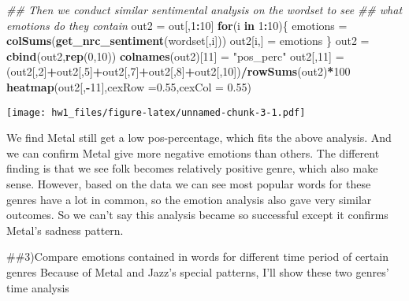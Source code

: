 \documentclass[]{article}
\newenvironment{Shaded}{\begin{snugshade}}{\end{snugshade}}
\newcommand{\CommentTok}[1]{\textcolor[rgb]{0.56,0.35,0.01}{\textit{#1}}}
\newcommand{\ControlFlowTok}[1]{\textcolor[rgb]{0.13,0.29,0.53}{\textbf{#1}}}
\newcommand{\DataTypeTok}[1]{\textcolor[rgb]{0.13,0.29,0.53}{#1}}
\newcommand{\DecValTok}[1]{\textcolor[rgb]{0.00,0.00,0.81}{#1}}
\newcommand{\FloatTok}[1]{\textcolor[rgb]{0.00,0.00,0.81}{#1}}
\newcommand{\KeywordTok}[1]{\textcolor[rgb]{0.13,0.29,0.53}{\textbf{#1}}}
\newcommand{\NormalTok}[1]{#1}
\newcommand{\OperatorTok}[1]{\textcolor[rgb]{0.81,0.36,0.00}{\textbf{#1}}}
\newcommand{\StringTok}[1]{\textcolor[rgb]{0.31,0.60,0.02}{#1}}
\begin{document}
\begin{Shaded}
\begin{Highlighting}[]
\CommentTok{## Then we conduct similar sentimental analysis on the wordset to see}
\CommentTok{## what emotions do they contain}
\NormalTok{out2 =}\StringTok{  }\NormalTok{out[,}\DecValTok{1}\OperatorTok{:}\DecValTok{10}\NormalTok{]}
\ControlFlowTok{for}\NormalTok{(i }\ControlFlowTok{in} \DecValTok{1}\OperatorTok{:}\DecValTok{10}\NormalTok{)\{}
\NormalTok{  emotions =}\StringTok{ }\KeywordTok{colSums}\NormalTok{(}\KeywordTok{get_nrc_sentiment}\NormalTok{(wordset[,i]))}
\NormalTok{  out2[i,] =}\StringTok{ }\NormalTok{emotions}
\NormalTok{\}}
\NormalTok{out2 =}\StringTok{ }\KeywordTok{cbind}\NormalTok{(out2,}\KeywordTok{rep}\NormalTok{(}\DecValTok{0}\NormalTok{,}\DecValTok{10}\NormalTok{))}
\KeywordTok{colnames}\NormalTok{(out2)[}\DecValTok{11}\NormalTok{] =}\StringTok{ "pos_perc"}
\NormalTok{out2[,}\DecValTok{11}\NormalTok{] =}\StringTok{ }\NormalTok{(out2[,}\DecValTok{2}\NormalTok{]}\OperatorTok{+}\NormalTok{out2[,}\DecValTok{5}\NormalTok{]}\OperatorTok{+}\NormalTok{out2[,}\DecValTok{7}\NormalTok{]}\OperatorTok{+}\NormalTok{out2[,}\DecValTok{8}\NormalTok{]}\OperatorTok{+}\NormalTok{out2[,}\DecValTok{10}\NormalTok{])}\OperatorTok{/}\KeywordTok{rowSums}\NormalTok{(out2)}\OperatorTok{*}\DecValTok{100}
\KeywordTok{heatmap}\NormalTok{(out2[,}\OperatorTok{-}\DecValTok{11}\NormalTok{],}\DataTypeTok{cexRow =}\FloatTok{0.55}\NormalTok{,}\DataTypeTok{cexCol =} \FloatTok{0.55}\NormalTok{)}
\end{Highlighting}
\end{Shaded}

\texttt{[image: hw1\_files/figure-latex/unnamed-chunk-3-1.pdf]}

We find Metal still get a low pos-percentage, which fits the above
analysis. And we can confirm Metal give more negative emotions than
others. The different finding is that we see folk becomes relatively
positive genre, which also make sense. However, based on the data we can
see most popular words for these genres have a lot in common, so the
emotion analysis also gave very similar outcomes. So we can't say this
analysis became so successful except it confirms Metal's sadness
pattern.

\#\#3)Compare emotions contained in words for different time period of
certain genres Because of Metal and Jazz's special patterns, I'll show
these two genres' time analysis
\end{document}
